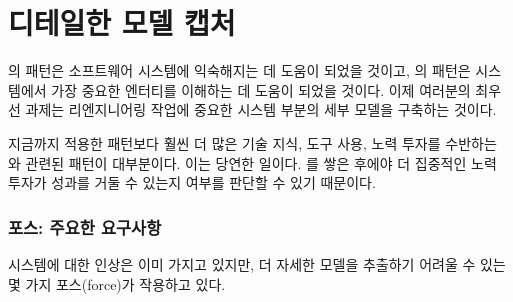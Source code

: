 \documentclass[a4paper,10pt,twoside]{book}
\begin{document}
	\renewcommand{\nnbb}[2]{} %
	\sloppy
\fi
\chapter{디테일한 모델 캡처}

의 패턴은 소프트웨어 시스템에 익숙해지는 데 도움이 되었을 것이고, 의 패턴은 시스템에서 가장 중요한 엔터티를 이해하는 데 도움이 되었을 것이다. 이제 여러분의 최우선 과제는 리엔지니어링 작업에 중요한 시스템 부분의 세부 모델을 구축하는 것이다.

지금까지 적용한 패턴보다 훨씬 더 많은 기술 지식, 도구 사용, 노력 투자를 수반하는 와 관련된 패턴이 대부분이다. 이는 당연한 일이다. 를 쌓은 후에야 더 집중적인 노력 투자가 성과를 거둘 수 있는지 여부를 판단할 수 있기 때문이다.

\subsection*{포스: 주요한 요구사항}

시스템에 대한 인상은 이미 가지고 있지만, 더 자세한 모델을 추출하기 어려울 수 있는 몇 가지 포스(force)가 작용하고 있다.
\end{document}
